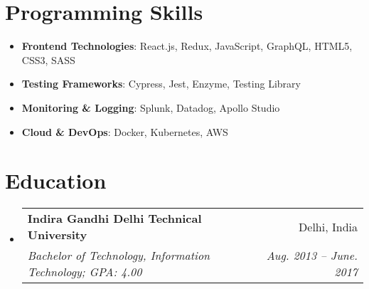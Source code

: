 \documentclass[letterpaper,11pt]{article}
\makeatletter
\newcommand{\resumeSubheading}[4]{
    \vspace{-1pt}\item
    \begin{tabular*}{0.97\textwidth}[t]{l@{\extracolsep{\fill}}r}
        \textbf{#1} & #2 \\
        \textit{\small#3} & \textit{\small #4} \\
    \end{tabular*}\vspace{-5pt}
}
\newcommand{\resumeSubHeadingListStart}{\begin{itemize}[leftmargin=*]}
\newcommand{\resumeSubHeadingListEnd}{\end{itemize}}
\makeatother
\begin{document}
%
\section{Programming Skills}
\resumeSubHeadingListStart
\item{
\textbf{Frontend Technologies}{: React.js, Redux, JavaScript, GraphQL, HTML5, CSS3, SASS}
}
\item{
\textbf{Testing Frameworks}{: Cypress, Jest, Enzyme, Testing Library}
}
\item{
\textbf{Monitoring \& Logging}{: Splunk, Datadog, Apollo Studio}
}
\item{
\textbf{Cloud \& DevOps}{: Docker, Kubernetes, AWS}
}
\resumeSubHeadingListEnd

\section{Education}
\resumeSubHeadingListStart
\resumeSubheading
{Indira Gandhi Delhi Technical University}{Delhi, India}
{Bachelor of Technology, Information Technology;  GPA: 4.00}{Aug. 2013 -- June. 2017}
\resumeSubHeadingListEnd


\end{document}
